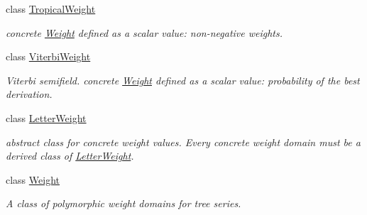 \begin{DoxyCompactItemize}
class \mbox{\hyperlink{classTropicalWeight}{Tropical\+Weight}}
\begin{DoxyCompactList}\small\item\em concrete \mbox{\hyperlink{classWeight}{Weight}} defined as a scalar value\+: non-\/negative weights. \end{DoxyCompactList}\item 
class \mbox{\hyperlink{classViterbiWeight}{Viterbi\+Weight}}
\begin{DoxyCompactList}\small\item\em Viterbi semifield. concrete \mbox{\hyperlink{classWeight}{Weight}} defined as a scalar value\+: probability of the best derivation. \end{DoxyCompactList}\item 
class \mbox{\hyperlink{classLetterWeight}{Letter\+Weight}}
\begin{DoxyCompactList}\small\item\em abstract class for concrete weight values. Every concrete weight domain must be a derived class of \mbox{\hyperlink{classLetterWeight}{Letter\+Weight}}. \end{DoxyCompactList}\item 
class \mbox{\hyperlink{classWeight}{Weight}}
\begin{DoxyCompactList}\small\item\em A class of polymorphic weight domains for tree series. \end{DoxyCompactList}\end{DoxyCompactItemize}
